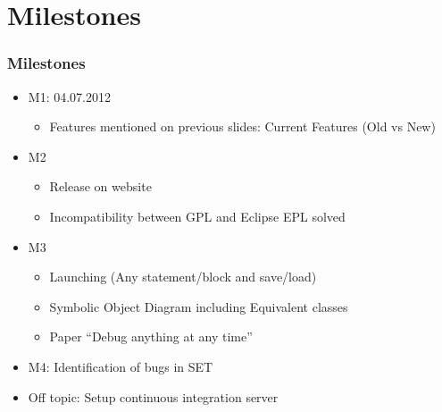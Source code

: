 \documentclass[accentcolor=tud9d,colorbacktitle,inverttitle,landscape,english,presentation,t]{tudbeamer}
\begin{document}
\section{Milestones}
   \begin{frame}[t]
		\frametitle{Milestones}
      
      \begin{itemize}
         \item M1: 04.07.2012
               \begin{itemize}
                  \item Features mentioned on previous slides: Current Features (Old vs New)
               \end{itemize}         
         \item M2
               \begin{itemize}
                  \item Release on \KeY website
                  \item Incompatibility between \KeY GPL and Eclipse EPL solved
               \end{itemize}         
         \item M3
               \begin{itemize}
                  \item Launching (Any statement/block and save/load)
                  \item Symbolic Object Diagram including Equivalent classes
                  \item Paper "`Debug anything at any time"'
               \end{itemize}
         \item M4: Identification of bugs in SET
         \item Off topic: Setup continuous integration server
      \end{itemize}
	\end{frame}
   
\end{document}
